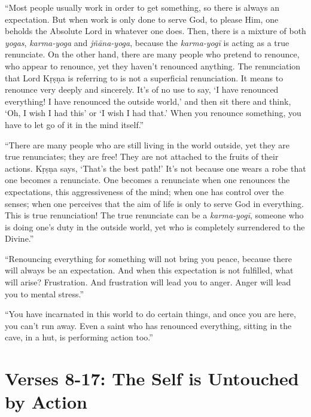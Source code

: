 \enquote{Most people usually work in order to get something, so there is always an expectation. But when work is only done to serve God, to please Him, one beholds the Absolute Lord in whatever one does. Then, there is a mixture of both \textit{yogas}, \textit{karma-yoga} and \textit{jñāna-yoga}, because the \textit{karma-yogī} is acting as a true renunciate. On the other hand, there are many people who pretend to renounce, who appear to renounce, yet they haven’t renounced anything. The renunciation that Lord Kṛṣṇa is referring to is not a superficial renunciation. It means to renounce very deeply and sincerely. It’s of no use to say, \enquote{I have renounced everything! I have renounced the outside world,} and then sit there and think, \enquote{Oh, I wish I had this} or \enquote{I wish I had that.} When you renounce something, you have to let go of it in the mind itself.}

\enquote{There are many people who are still living in the world outside, yet they are true renunciates; they are free! They are not attached to the fruits of their actions. Kṛṣṇa says, \enquote{That’s the best path!} It’s not because one wears a robe that one becomes a renunciate. One becomes a renunciate when one renounces the expectations, this aggressiveness of the mind; when one has control over the senses; when one perceives that the aim of life is only to serve God in everything. This is true renunciation! The true renunciate can be a \textit{karma-yogī}, someone who is doing one’s duty in the outside world, yet who is completely surrendered to the Divine.}

\enquote{Renouncing everything for something will not bring you peace, because there will always be an expectation. And when this expectation is not fulfilled, what will arise? Frustration. And frustration will lead you to anger. Anger will lead you to mental stress.}

\enquote{You have incarnated in this world to do certain things, and once you are here, you can’t run away. Even a saint who has renounced everything, sitting in the cave, in a hut, is performing action too.}

\newpage
\section{Verses 8-17: The Self is Untouched by Action}\label{sec-verses-8-17-the-self-is-untouched-by-action}


